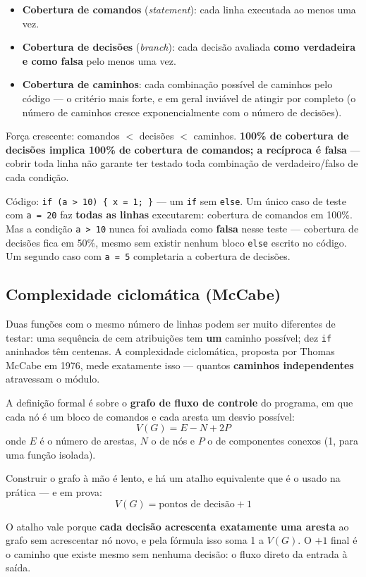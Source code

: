 \begin{conceito}
\begin{itemize}
\item \textbf{Cobertura de comandos} (\textit{statement}): cada linha
executada ao menos uma vez.
\item \textbf{Cobertura de decisões} (\textit{branch}): cada decisão
avaliada \textbf{como verdadeira e como falsa} pelo menos uma vez.
\item \textbf{Cobertura de caminhos}: cada combinação possível de
caminhos pelo código --- o critério mais forte, e em geral inviável de
atingir por completo (o número de caminhos cresce exponencialmente com o
número de decisões).
\end{itemize}
Força crescente: comandos $<$ decisões $<$ caminhos. \textbf{100\% de
cobertura de decisões implica 100\% de cobertura de comandos; a recíproca é
falsa} --- cobrir toda linha não garante ter testado toda combinação de
verdadeiro/falso de cada condição.
\end{conceito}

\begin{exemplo}
Código: \texttt{if (a > 10) \{ x = 1; \}} --- um \texttt{if} sem
\texttt{else}. Um único caso de teste com \texttt{a = 20} faz \textbf{todas
as linhas} executarem: cobertura de comandos em 100\%. Mas a condição
\texttt{a > 10} nunca foi avaliada como \textbf{falsa} nesse teste ---
cobertura de decisões fica em 50\%, mesmo sem existir nenhum bloco
\texttt{else} escrito no código. Um segundo caso com \texttt{a = 5}
completaria a cobertura de decisões.
\end{exemplo}

\subsection{Complexidade ciclomática (McCabe)}

\begin{conceito}
Duas funções com o mesmo número de linhas podem ser muito diferentes de
testar: uma sequência de cem atribuições tem \textbf{um} caminho possível;
dez \texttt{if} aninhados têm centenas. A complexidade ciclomática, proposta
por Thomas McCabe em 1976, mede exatamente isso --- quantos
\textbf{caminhos independentes} atravessam o módulo.

A definição formal é sobre o \textbf{grafo de fluxo de controle} do
programa, em que cada nó é um bloco de comandos e cada aresta um desvio
possível:
\[ V(G) = E - N + 2P \]
onde $E$ é o número de arestas, $N$ o de nós e $P$ o de componentes conexos
(1, para uma função isolada).

Construir o grafo à mão é lento, e há um atalho equivalente que é o usado na
prática --- e em prova:
\[ V(G) = \text{pontos de decisão} + 1 \]

O atalho vale porque \textbf{cada decisão acrescenta exatamente uma aresta}
ao grafo sem acrescentar nó novo, e pela fórmula isso soma 1 a $V(G)$. O
$+1$ final é o caminho que existe mesmo sem nenhuma decisão: o fluxo direto
da entrada à saída.
\end{conceito}

